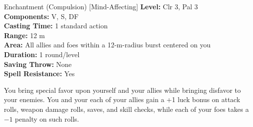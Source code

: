 {Enchantment (Compulsion) [Mind-Affecting]}
{
	\textbf{Level:}
	Clr 3, Pal 3\\
	\textbf{Components:}
	V, S, DF\\
	\textbf{Casting Time:}
	1 standard action\\
	\textbf{Range:}
	12 m\\
	\textbf{Area:}
	All allies and foes within a 12-m-radius burst centered on you\\
	\textbf{Duration:}
	1 round/level\\
	\textbf{Saving Throw:}
	None\\
	\textbf{Spell Resistance:}
	Yes\\
}
{
	You bring special favor upon yourself and your allies while bringing disfavor to your enemies. You and your each of your allies gain a +1 luck bonus on attack rolls, weapon damage rolls, saves, and skill checks, while each of your foes takes a $-1$ penalty on such rolls.

}

